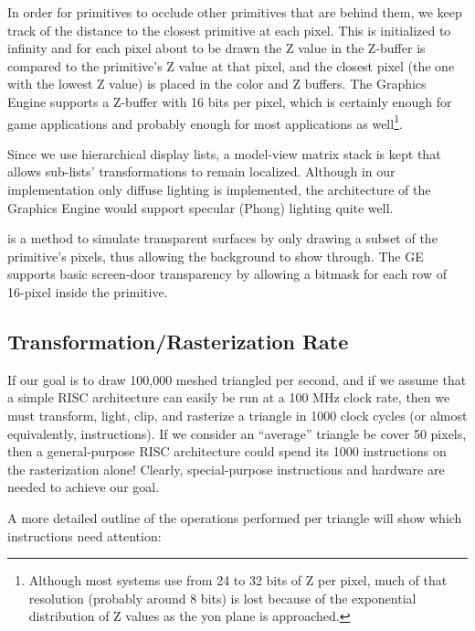 \documentclass{book}
\begin{document}
In order for primitives to occlude other primitives that are behind
them, we keep track of the distance to the closest primitive at each
pixel.  This  is initialized to infinity
and for each pixel about to be drawn the Z value in the Z-buffer is
compared to the primitive's Z value at that pixel, and the closest
pixel (the one with the lowest Z value) is placed in the color and Z
buffers.  The Graphics Engine supports a Z-buffer with 16 bits per
pixel, which is certainly enough for game applications and probably
enough for most applications as well\footnote{Although most systems
use from 24 to 32 bits of Z per pixel, much of that resolution (probably
around 8 bits) is lost because of the exponential distribution of Z
values as the yon plane is approached.}.

Since we use hierarchical display lists, a model-view matrix stack is kept
that allows sub-lists' transformations to remain localized.
Although
in our implementation only diffuse lighting is implemented, the
architecture of the Graphics Engine would support specular
(Phong) lighting quite well.

 is a
method to simulate transparent surfaces by only drawing a subset
of the primitive's pixels, thus allowing the background to show
through.  The GE supports basic screen-door transparency by allowing
a bitmask for each row of 16-pixel inside the primitive.


\subsection{Transformation/Rasterization Rate}

If our goal is to draw 100,000 meshed triangled per second, and if we
assume that a simple RISC architecture can easily be run at a 100 MHz
clock rate, then we must transform, light, clip, and rasterize a
triangle in 1000 clock cycles (or almost equivalently, instructions).
If we consider an ``average'' triangle be cover 50 pixels, then a
general-purpose RISC architecture could spend its 1000 instructions
on the rasterization alone!  Clearly, special-purpose instructions
and hardware are needed to achieve our goal.

A more detailed outline of the operations performed per triangle will
show which instructions need attention:
\end{document}
